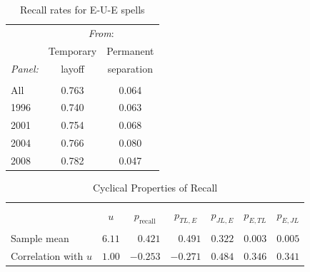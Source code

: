 \documentclass[12pt]{article}
\begin{document}

    \begin{table}
      \caption{Recall rates for E-U-E spells}
      \begin{center}
\begin{tabular}{l|cc}
  \hline \hline
   & \multicolumn{2}{c}{\textit{From}:} \\[0.35em]
                                     &\multicolumn{1}{c}{Temporary} & \multicolumn{1}{c}{Permanent} \\
   \textit{Panel:}                                  
                                     &\multicolumn{1}{c}{layoff} & 
                                     \multicolumn{1}{c}{separation} 
                                     \\[0.35em]
                                     \hline \\[-1em]
  All  & 0.763 & 0.064 \\[.35em]
  1996 & 0.740 & 0.063 \\[.35em]
  2001 & 0.754 & 0.068 \\[.35em]
  2004 & 0.766 & 0.080 \\[.35em]
  2008 & 0.782 & 0.047 \\[.35em]
               \hline
\end{tabular}
      \end{center}
    \end{table}

    \begin{table}
      \caption{Cyclical Properties of Recall}
      \begin{center}
    \begin{tabular}{l|rrrrrr}
      \hline
      \hline \\ [-1em] 
      & \multicolumn{1}{c}{$u$} & \multicolumn{1}{c}{$p_{\text{recall}}$} & \multicolumn{1}{c}{$p_{TL,E}$} & \multicolumn{1}{c}{$p_{JL,E}$} & \multicolumn{1}{c}{$p_{E,TL}$} & \multicolumn{1}{c}{$p_{E,JL}$} \\[0.35em]  
      \hline \\[-1em]
      Sample mean                 & $6.11$ & $0.421 $ & $0.491 $ & $0.322$ & $0.003$ & $0.005$ \\[.35em]
      Correlation with $u$ & $1.00$ & $-0.253$ & $-0.271$ & $0.484$ & $0.346$ & $0.341$ \\[.35em]
      \hline
      \hline
    \end{tabular}
      \end{center}
  \end{table}
\end{document}
